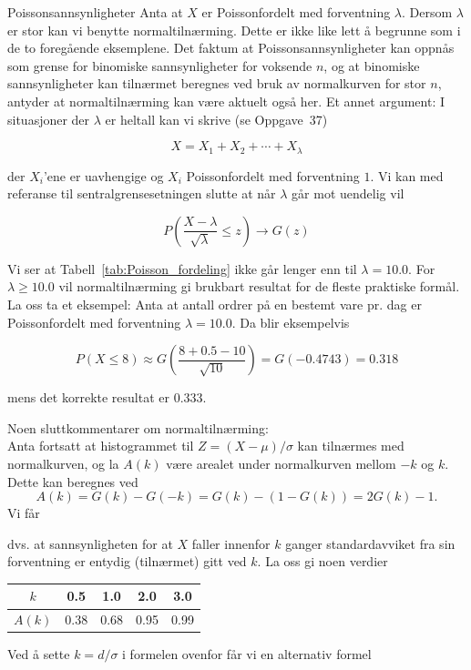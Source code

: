 \begin{eksempel}{Poissonsannsynligheter}
Anta at $X$ er Poissonfordelt med forventning $\lambda$. Dersom
$\lambda$ er stor kan vi benytte normaltilnærming. Dette er ikke
like lett å begrunne som i de to foregående eksemplene. Det
faktum at Poissonsannsynligheter kan oppnås som grense for
binomiske sannsynligheter for voksende $n$, og at binomiske
sannsynligheter kan tilnærmet beregnes ved bruk av normalkurven
for stor $n$, antyder at normaltilnærming kan være aktuelt også
her. Et annet argument: I situasjoner der $\lambda$ er heltall
kan vi skrive (se Oppgave~37)

\[  X=X_1+X_2+\cdots +X_{\lambda} \]

\noindent der $X_i$'ene er uavhengige og $X_i$ Poissonfordelt med
forventning $1$. Vi kan med referanse til
sentralgrensesetningen slutte at når $\lambda$ går mot uendelig vil

\[  P(\frac{X- \lambda}{\sqrt{\lambda}}\leq z) \rightarrow G(z) \]

\noindent Vi ser at Tabell~\ref{tab:Poisson_fordeling} ikke går lenger enn til $\lambda =10.0$. For
$\lambda \geq 10.0$ vil normaltilnærming gi brukbart resultat for
de fleste praktiske formål. La oss ta et eksempel: Anta at antall
ordrer på en bestemt vare pr. dag er Poissonfordelt med
forventning $\lambda =10.0$. Da blir eksempelvis

\[P(X \leq 8) \approx G(\frac{8+0.5-10}{\sqrt{10}})=G(-0.4743)=0.318 \]

\noindent mens det korrekte resultat er 0.333. \\
\end{eksempel}
Noen sluttkommentarer om normaltilnærming: \\
Anta fortsatt at histogrammet til $Z=(X-\mu )/\sigma$ kan tilnærmes
med normalkurven, og la $A(k)$ være arealet under normalkurven
mellom $-k$ og $k$. Dette kan beregnes ved
\[ A(k)=G(k)-G(-k)=G(k)-(1-G(k))=2G(k)-1. \]
\noindent Vi får

\begin{center}  \end{center}

\noindent dvs. at sannsynligheten for at $X$ faller innenfor $k$ ganger
standardavviket fra sin forventning er entydig (tilnærmet) gitt ved $k$. La
oss gi noen verdier
\begin{center}
\begin{tabular}{c|cccc}
 $k$&  0.5  &  1.0  &  2.0  &  3.0 \\ \hline
 $A(k)$&0.38&0.68&0.95&0.99  
\end{tabular}
\end{center}
\noindent Ved å sette $k=d/\sigma$ i formelen ovenfor får vi en
 alternativ formel

